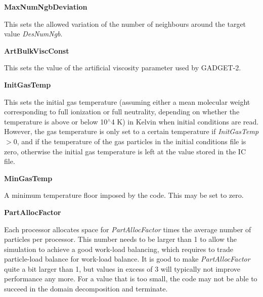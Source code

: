 \begin{DoxyItemize}
\item {\bfseries MaxNumNgbDeviation} \par
 This sets the allowed variation of the number of neighbours around the target value {\itshape DesNumNgb\/}.
\end{DoxyItemize}


\begin{DoxyItemize}
\item {\bfseries ArtBulkViscConst} \par
 This sets the value of the artificial viscosity parameter used by GADGET-\/2.
\end{DoxyItemize}


\begin{DoxyItemize}
\item {\bfseries InitGasTemp} \par
 This sets the initial gas temperature (assuming either a mean molecular weight corresponding to full ionization or full neutrality, depending on whether the temperature is above or below 10$^\wedge$4 K) in Kelvin when initial conditions are read. However, the gas temperature is only set to a certain temperature if {\itshape InitGasTemp\/}$>$0, and if the temperature of the gas particles in the initial conditions file is zero, otherwise the initial gas temperature is left at the value stored in the IC file.
\end{DoxyItemize}


\begin{DoxyItemize}
\item {\bfseries MinGasTemp} \par
 A minimum temperature floor imposed by the code. This may be set to zero.
\end{DoxyItemize}


\begin{DoxyItemize}
\item {\bfseries PartAllocFactor} \par
 Each processor allocates space for {\itshape PartAllocFactor\/} times the average number of particles per processor. This number needs to be larger than 1 to allow the simulation to achieve a good work-\/load balancing, which requires to trade particle-\/load balance for work-\/load balance. It is good to make {\itshape PartAllocFactor\/} quite a bit larger than 1, but values in excess of 3 will typically not improve performance any more. For a value that is too small, the code may not be able to succeed in the domain decomposition and terminate.
\end{DoxyItemize}


